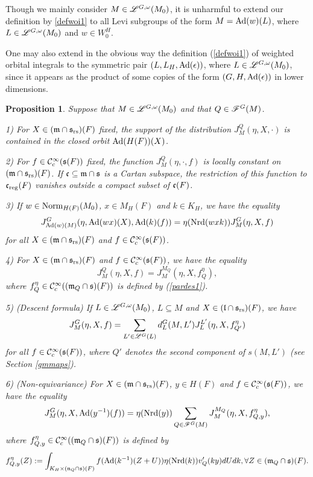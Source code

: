 \documentclass[a4paper]{amsart}
\newcommand{\fm}{{\mathfrak{m}}} \newcommand{\fn}{{\mathfrak{n}}}\newcommand{\fo}{{\mathfrak{o}}} \newcommand{\fp}{{\mathfrak{p}}}
\newtheorem{prop}[thm]{Proposition}
\theoremstyle{definition}
\theoremstyle{remark}
\numberwithin{equation}{subsection}
\begin{document}
Though we mainly consider $M\in\mathscr{L}^{G,\omega}(M_0)$, it is unharmful to extend our definition by \eqref{defwoi1} to all Levi subgroups of the form $M={\mathrm{Ad}}(w)(L)$, where $L\in\mathscr{L}^{G,\omega}(M_0)$ and $w\in W_0^H$. 

One may also extend in the obvious way the definition (\ref{defwoi1}) of weighted orbital integrals to the symmetric pair $(L, L_H, {\mathrm{Ad}}(\epsilon))$, where $L\in\mathscr{L}^{G,\omega}(M_0)$, since it appears as the product of some copies of the form $(G, H, {\mathrm{Ad}}(\epsilon))$ in lower dimensions. 

\begin{prop}\label{propwoi1}
Suppose that $M\in\mathscr{L}^{G,\omega}(M_0)$ and that $Q\in\mathscr{F}^G(M)$. 

1) For $X\in(\fm\cap\fs_\rs)(F)$ fixed, the support of the distribution $J_M^Q(\eta, X, \cdot)$ is contained in the closed orbit ${\mathrm{Ad}}(H(F))(X)$. 

2) For $f\in {\mathcal {C}}_c^\infty({\mathfrak{s}}(F))$ fixed, the function $J_M^Q(\eta, \cdot, f)$ is locally constant  on $(\fm\cap\fs_\rs)(F)$. If $\fc\subseteq\fm\cap\fs$ is a Cartan subspace, the restriction of this function to ${\mathfrak{c}}_{\mathrm{reg}}(F)$ vanishes outside a compact subset of ${\mathfrak{c}}(F)$. 

3) If $w\in {\mathrm{Norm}}_{H(F)}(M_0)$, $x\in M_H(F)$ and $k\in K_H$, we have the equality
$$ J_{{\mathrm{Ad}}(w)(M)}^G(\eta, {\mathrm{Ad}}(wx)(X), {\mathrm{Ad}}(k)(f))=\eta({\mathrm{Nrd}}(wxk)) J_M^G(\eta, X, f) $$
for all $X\in(\fm\cap\fs_\rs)(F)$ and $f\in{\mathcal {C}}_c^\infty({\mathfrak{s}}(F))$. 

4) For $X\in(\fm\cap\fs_\rs)(F)$ and $f\in {\mathcal {C}}_c^\infty({\mathfrak{s}}(F))$, we have the equality
$$ J_M^Q(\eta, X, f)=J_M^{M_Q}(\eta, X, f_Q^\eta), $$
where $f_Q^\eta\in\CC_c^\infty((\fm_Q\cap\fs)(F))$ is defined by (\ref{pardes1}). 

5) (Descent formula) If $L\in\mathscr{L}^{G,\omega}(M_0)$, $L\subseteq M$ and $X\in({\mathfrak{l}}\cap{\mathfrak{s}}_{\mathrm{rs}})(F)$, we have
$$ J_M^G(\eta, X, f)=\sum_{L'\in\mathscr{L}^G(L)} d_L^G(M, L') J_L^{L'}(\eta, X, f_{Q'}^\eta) $$
for all $f\in{\mathcal {C}}_c^\infty({\mathfrak{s}}(F))$, where $Q'$ denotes the second component of $s(M,L')$ (see Section \ref{gmmaps}). 

6) (Non-equivariance) For $X\in(\fm\cap\fs_\rs)(F)$, $y\in H(F)$ and $f\in{\mathcal {C}}_c^\infty({\mathfrak{s}}(F))$, we have the equality
$$ J_M^G(\eta, X, {\mathrm{Ad}}(y^{-1})(f))=\eta({\mathrm{Nrd}}(y)) \sum_{Q\in\mathscr{F}^G(M)} J_M^{M_Q}(\eta, X, f_{Q,y}^\eta), $$
where $f_{Q,y}^\eta\in\CC_c^\infty((\fm_Q\cap\fs)(F))$ is defined by
\begin{equation}\label{nonequcst1}
 f_{Q,y}^\eta(Z):=\int_{K_H\times(\fn_Q\cap\fs)(F)} f(\Ad(k^{-1})(Z+U)) \eta(\Nrd(k)) v'_Q(ky) dUdk, \forall Z\in(\fm_Q\cap\fs)(F). 
\end{equation}
\end{prop}
\end{document}
